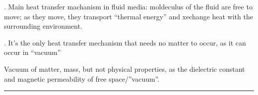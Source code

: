 \documentclass[letterpaper,10pt,english]{jupyterBook}
\begin{document}
\sphinxAtStartPar
{\hyperref[\detokenize{ch/heat-transfer-convection:classical-thermodynamics-heat-transmission-convection}]{}}. Main heat transfer machanism in fluid media: moldeculus of the fluid are free to move; as they move, they transport “thermal energy” and xechange heat with the surrounding environment.

\sphinxAtStartPar
{\hyperref[\detokenize{ch/heat-transfer-radiation:classical-thermodynamics-heat-transmission-radiation}]{}}. It’s the only heat transfer mechanism that needs no matter to occur, as it can occur in “vacuum”%
\begin{footnote}[1]\sphinxAtStartFootnote
Vacuum of matter, mass, but not physical properties, as the dielectric constant and magnetic permeability of free space/”vacuum”.
%
\end{footnote}


\bigskip\hrule\bigskip


\sphinxstepscope
\end{document}
